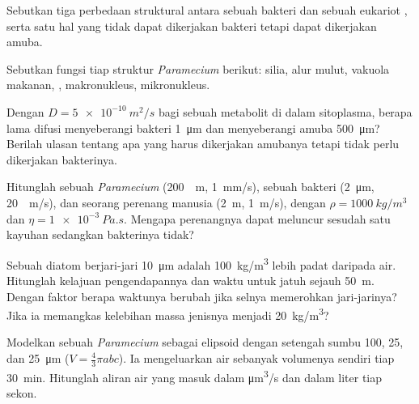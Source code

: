 \begin{exercise}[$\star$]\label{exo:b2:unicellular-diversity:3}
Sebutkan tiga perbedaan struktural antara sebuah bakteri dan sebuah
eukariot , serta satu hal yang tidak dapat dikerjakan
bakteri tetapi dapat dikerjakan amuba.
\end{exercise}

\begin{exercise}[$\star$]\label{exo:b2:unicellular-diversity:4}
Sebutkan fungsi tiap struktur \emph{Paramecium} berikut: silia, alur
mulut, vakuola makanan, , makronukleus,
mikronukleus.
\end{exercise}

\begin{exercise}[$\star\star$]\label{exo:b2:unicellular-diversity:5}
Dengan $D = \qty{5e-10}{m^2/s}$ bagi sebuah metabolit di dalam
sitoplasma, berapa lama difusi menyeberangi bakteri \qty{1}{\micro m}
dan menyeberangi amuba \qty{500}{\micro m}? Berilah ulasan tentang apa
yang harus dikerjakan amubanya tetapi tidak perlu dikerjakan bakterinya.
\end{exercise}

\begin{exercise}[$\star\star$]\label{exo:b2:unicellular-diversity:6}
Hitunglah  sebuah \emph{Paramecium} (\qty{200}{\micro
m}, \qty{1}{mm/s}), sebuah bakteri (\qty{2}{\micro m}, \qty{20}{\micro
m/s}), dan seorang perenang manusia (\qty{2}{m}, \qty{1}{m/s}), dengan
$\rho = \qty{1000}{kg/m^3}$ dan $\eta = \qty{1e-3}{Pa.s}$. Mengapa
perenangnya dapat meluncur sesudah satu kayuhan sedangkan bakterinya tidak?
\end{exercise}

\begin{exercise}[$\star\star$]\label{exo:b2:unicellular-diversity:7}
Sebuah diatom berjari-jari \qty{10}{\micro m} adalah \qty{100}{kg/m^3}
lebih padat daripada air. Hitunglah kelajuan pengendapannya dan waktu
untuk jatuh sejauh \qty{50}{m}. Dengan faktor berapa waktunya berubah
jika selnya memerohkan jari-jarinya? Jika ia memangkas kelebihan massa
jenisnya menjadi \qty{20}{kg/m^3}?
\end{exercise}

\begin{exercise}[$\star\star$]\label{exo:b2:unicellular-diversity:8}
Modelkan sebuah \emph{Paramecium} sebagai elipsoid dengan setengah
sumbu \num{100}, \num{25}, dan \qty{25}{\micro m} ($V = \tfrac{4}{3}\pi abc$).
Ia mengeluarkan air sebanyak volumenya sendiri tiap \qty{30}{min}.
Hitunglah aliran air yang masuk dalam \unit{\micro m^3/s} dan dalam
liter tiap sekon.
\end{exercise}

